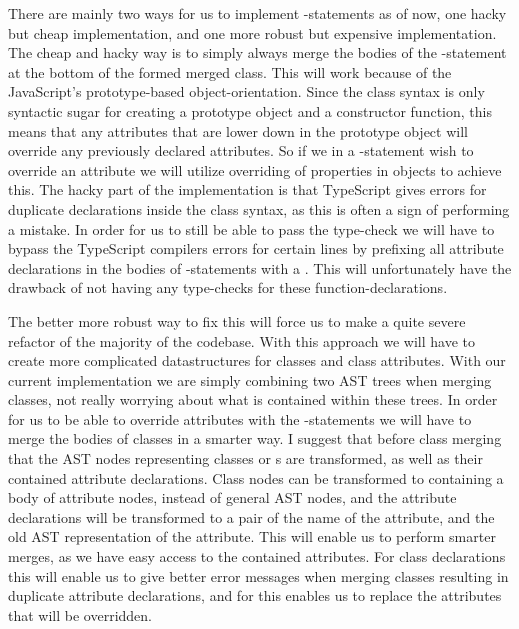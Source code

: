 There are mainly two ways for us to implement -statements as of now, one hacky but cheap implementation, and one more robust but expensive implementation.
The cheap and hacky way is to simply always merge the bodies of the -statement at the bottom of the formed merged class.
This will work because of the JavaScript's prototype-based object-orientation.
Since the class syntax is only syntactic sugar for creating a prototype object and a constructor function, this means that any attributes that are lower down in the prototype object will override any previously declared attributes.
So if we in a -statement wish to override an attribute we will utilize overriding of properties in objects to achieve this.
The hacky part of the implementation is that TypeScript gives errors for duplicate declarations inside the class syntax, as this is often a sign of performing a mistake.
In order for us to still be able to pass the type-check we will have to bypass the TypeScript compilers errors for certain lines by prefixing all attribute declarations in the bodies of -statements with a .
This will unfortunately have the drawback of not having any type-checks for these function-declarations.

The better more robust way to fix this will force us to make a quite severe refactor of the majority of the codebase.
With this approach we will have to create more complicated datastructures for classes and class attributes.
With our current implementation we are simply combining two AST trees when merging classes, not really worrying about what is contained within these trees.
In order for us to be able to override attributes with the -statements we will have to merge the bodies of classes in a smarter way.
I suggest that before class merging that the AST nodes representing classes or s are transformed, as well as their contained attribute declarations.
Class nodes can be transformed to containing a body of attribute nodes, instead of general AST nodes, and the attribute declarations will be transformed to a pair of the name of the attribute, and the old AST representation of the attribute.
This will enable us to perform smarter merges, as we have easy access to the contained attributes.
For class declarations this will enable us to give better error messages when merging classes resulting in duplicate attribute declarations, and for  this enables us to replace the attributes that will be overridden.

